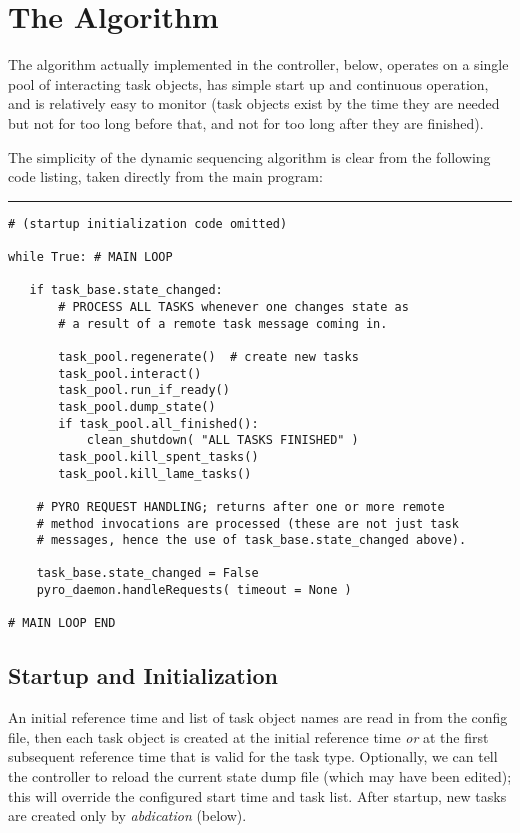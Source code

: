 \documentclass[11pt,a4paper]{report}
\begin{document}
\section{The Algorithm}

The algorithm actually implemented in the controller, below, operates on
a single pool of interacting task objects, has simple start up and
continuous operation, and is relatively easy to monitor (task objects
exist by the time they are needed but not for too long before that, and
not for too long after they are finished). 

The simplicity of the dynamic sequencing algorithm is clear from the
following code listing, taken directly from the main program:

\pagebreak

\noindent
\rule{5cm}{.2mm}
\begin{lstlisting}
# (startup initialization code omitted)

while True: # MAIN LOOP

   if task_base.state_changed:
       # PROCESS ALL TASKS whenever one changes state as
       # a result of a remote task message coming in.

       task_pool.regenerate()  # create new tasks
       task_pool.interact()
       task_pool.run_if_ready()
       task_pool.dump_state()
       if task_pool.all_finished():
           clean_shutdown( "ALL TASKS FINISHED" )
       task_pool.kill_spent_tasks()
       task_pool.kill_lame_tasks()

    # PYRO REQUEST HANDLING; returns after one or more remote
    # method invocations are processed (these are not just task
    # messages, hence the use of task_base.state_changed above).

    task_base.state_changed = False
    pyro_daemon.handleRequests( timeout = None )

# MAIN LOOP END
\end{lstlisting}


\subsection{Startup and Initialization}

An initial reference time and list of task object names are read in from
the config file, then each task object is created at the initial
reference time {\em or} at the first subsequent reference time that is
valid for the task type. Optionally, we can tell the controller to
reload the current state dump file (which may have been edited); this
will override the configured start time and task list. After startup,
new tasks are created only by {\em abdication} (below).
\end{document}
